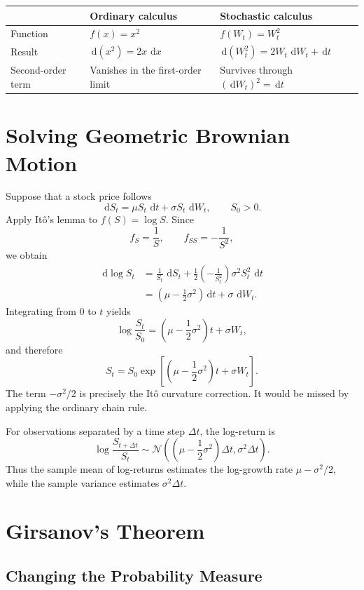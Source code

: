 \documentclass[12pt,openany]{book}
\theoremstyle{definition}
\theoremstyle{remark}
\newcommand{\dd}{\,\mathrm{d}}
\begin{document}
\begin{center}
\small
\begin{tabular}{@{}L{0.26\textwidth}L{0.31\textwidth}L{0.31\textwidth}@{}}
\toprule
& \textbf{Ordinary calculus} & \textbf{Stochastic calculus} \\
\midrule
Function & \(f(x)=x^2\) & \(f(W_t)=W_t^2\) \\
Result & \(\dd(x^2)=2x\,\dd x\) &
\(\dd(W_t^2)=2W_t\,\dd W_t+\dd t\) \\
Second-order term & Vanishes in the first-order limit &
Survives through \((\dd W_t)^2=\dd t\) \\
\bottomrule
\end{tabular}
\end{center}

\section{Solving Geometric Brownian Motion}

Suppose that a stock price follows
\[
\dd S_t=\mu S_t\,\dd t+\sigma S_t\,\dd W_t,
\qquad S_0>0.
\]
Apply Itô's lemma to \(f(S)=\log S\).  Since
\[
f_S=\frac1S,
\qquad
f_{SS}=-\frac1{S^2},
\]
we obtain
\[
\begin{aligned}
\dd\log S_t
&=\frac1{S_t}\,\dd S_t
+\frac12\left(-\frac1{S_t^2}\right)
  \sigma^2S_t^2\,\dd t\\
&=\left(\mu-\frac12\sigma^2\right)\dd t
+\sigma\,\dd W_t.
\end{aligned}
\]
Integrating from \(0\) to \(t\) yields
\[
\log\frac{S_t}{S_0}
=\left(\mu-\frac12\sigma^2\right)t+\sigma W_t,
\]
and therefore
\[
\boxed{
S_t=S_0\exp\!\left[
\left(\mu-\frac12\sigma^2\right)t+\sigma W_t
\right].
}
\]
The term \(-\sigma^2/2\) is precisely the Itô curvature correction.  It
would be missed by applying the ordinary chain rule.

For observations separated by a time step \(\Delta t\), the log-return is
\[
\log\frac{S_{t+\Delta t}}{S_t}
\sim\mathcal{N}\!\left(
\left(\mu-\frac12\sigma^2\right)\Delta t,
\sigma^2\Delta t
\right).
\]
Thus the sample mean of log-returns estimates the log-growth rate
\(\mu-\sigma^2/2\), while the sample variance estimates
\(\sigma^2\Delta t\).

\section{Girsanov's Theorem}

\subsection{Changing the Probability Measure}
\end{document}
